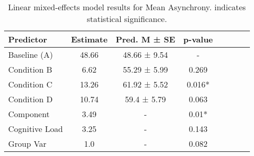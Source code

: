 
    \begin{table}[H]
    \centering
    \begin{small}
    \begin{tabular}{lccccccc}
\toprule
Predictor & Estimate & Pred. M ± SE & p-value \\
\midrule
Baseline (A) & 48.66 & 48.66 ± 9.54 & - \\
Condition B & 6.62 & 55.29 ± 5.99 & 0.269 \\
Condition C & 13.26 & 61.92 ± 5.52 & 0.016* \\
Condition D & 10.74 & 59.4 ± 5.79 & 0.063 \\
Component & 3.49 & - & 0.01* \\
Cognitive Load & 3.25 & - & 0.143 \\
Group Var & 1.0 & - & 0.082 \\
\bottomrule
\end{tabular}

    \end{small}
    \caption[Linear mixed-effects model results for Mean Asynchrony]{Linear mixed-effects model results for Mean Asynchrony. \newline * indicates statistical significance.}
    \label{tab:meanasynchrony}

    \end{table}